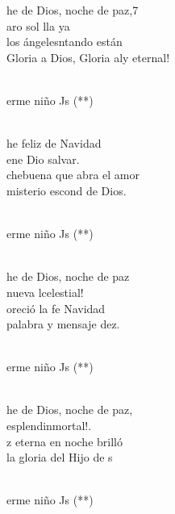 \documentclass[12pt]{article}
\begin{document}
\begin{multicols*}{2}
\begin{cancion}%
	he de Dios, noche de paz,7\\
	aro sol lla ya\\
	los ángelesntando están\\
	Gloria a Dios, Gloria aly eternal!\\\jump\\
	\begin{chorus}%
	erme niño Js (**) \\
	\end{chorus}%
	\jump\\
	he feliz de Navidad\\
	ene Dio salvar.\\
	chebuena que abra el amor\\
	 misterio escond de Dios.\\\jump\\
	\begin{chorus}%
	erme niño Js (**) \\
	\end{chorus}%
	\jump\\
	he de Dios, noche de paz\\
	nueva lcelestial!\\
	oreció la fe Navidad\\
	 palabra y mensaje dez.\\\jump\\
	\begin{chorus}%
	erme niño Js (**) \\
	\end{chorus}%
	\jump\\
	he de Dios, noche de paz,\\
	esplendinmortal!.\\
	z eterna en noche brilló\\
	 la gloria del Hijo de s\\\jump\\
	\begin{chorus}%
	erme niño Js (**) \\
	\end{chorus}%
	\jump\\
\end{cancion}%


\end{multicols*}
\end{document}
